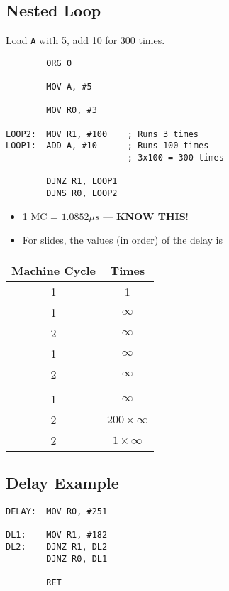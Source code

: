 \documentclass[12pt]{article}
\begin{document}
\subsection*{Nested Loop}
Load \texttt{A} with 5, add 10 for 300 times.

\begin{verbatim}
        ORG 0

        MOV A, #5

        MOV R0, #3

LOOP2:  MOV R1, #100    ; Runs 3 times
LOOP1:  ADD A, #10      ; Runs 100 times
                        ; 3x100 = 300 times

        DJNZ R1, LOOP1
        DJNS R0, LOOP2
\end{verbatim}

\begin{itemize}
    \item 1 MC = $1.0852 \mu s$ --- \textbf{KNOW THIS}!
    \item For slides, the values (in order) of the delay is
\end{itemize}

\begin{tabular}{|c|c|}
    \hline
    \textbf{Machine Cycle} & \textbf{Times} \\ \hline
    1 & 1 \\ \hline
    1 & $\infty$ \\  \hline
    2 & $\infty$ \\  \hline
    1 & $\infty$ \\  \hline
    2 & $\infty$ \\  \hline
      & \\ \hline
    1 & $\infty$ \\ \hline
    2 & $200 \times \infty$ \\ \hline
    2 & $1 \times \infty$ \\ \hline
\end{tabular}

\subsection*{Delay Example}
\begin{verbatim}
DELAY:  MOV R0, #251

DL1:    MOV R1, #182
DL2:    DJNZ R1, DL2
        DJNZ R0, DL1

        RET
\end{verbatim}
\end{document}
